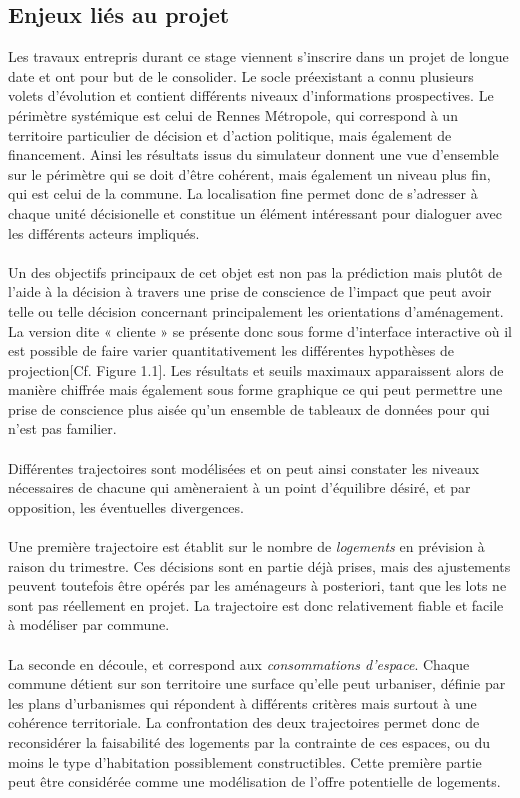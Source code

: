 \documentclass{bredele}
\begin{document}
\subsection{Enjeux liés au projet}
Les travaux entrepris durant ce stage viennent s’inscrire dans un projet de longue date et ont pour but de le consolider. Le socle préexistant a connu plusieurs volets d’évolution et contient différents niveaux d’informations prospectives. Le périmètre systémique est celui de Rennes Métropole, qui correspond à un territoire particulier de décision et d’action politique, mais également de financement. Ainsi les résultats issus du simulateur donnent une vue d’ensemble sur le périmètre qui se doit d'être cohérent, mais également un niveau plus fin, qui est celui de la commune. La localisation fine permet donc de s'adresser à chaque unité décisionelle et constitue un élément intéressant pour dialoguer avec les différents acteurs impliqués.
\\\\
Un des objectifs principaux de cet objet est non pas la prédiction mais plutôt de l’aide à la décision à travers une prise de conscience de l’impact que peut avoir telle ou telle décision concernant principalement les orientations d’aménagement. La version dite « cliente » se présente donc sous forme d’interface interactive où il est possible de faire varier quantitativement les différentes hypothèses de projection[Cf. Figure 1.1]. Les résultats et seuils maximaux apparaissent alors de manière chiffrée mais également sous forme graphique ce qui peut permettre une prise de conscience plus aisée qu'un ensemble de tableaux de données pour qui n'est pas familier.
\\\\
Différentes trajectoires sont modélisées et on peut ainsi constater les niveaux nécessaires de chacune qui amèneraient à un point d’équilibre désiré, et par opposition, les éventuelles divergences.
\\\\
Une première trajectoire est établit sur le nombre de \textit{logements} en prévision à raison du trimestre. Ces décisions sont en partie déjà prises, mais des ajustements peuvent toutefois être opérés par les aménageurs à posteriori, tant que les lots ne sont pas réellement en projet. La trajectoire est donc relativement fiable et facile à modéliser par commune.
\\\\
La seconde en découle, et correspond aux \textit{consommations d’espace}. Chaque commune détient sur son territoire une surface qu’elle peut urbaniser, définie par les plans d’urbanismes qui répondent à différents critères mais surtout à une cohérence territoriale. La confrontation des deux trajectoires permet donc de reconsidérer la faisabilité des logements par la contrainte de ces espaces, ou du moins le type d’habitation possiblement constructibles. Cette première partie peut être considérée comme une modélisation de l’offre potentielle de logements.
\end{document}
